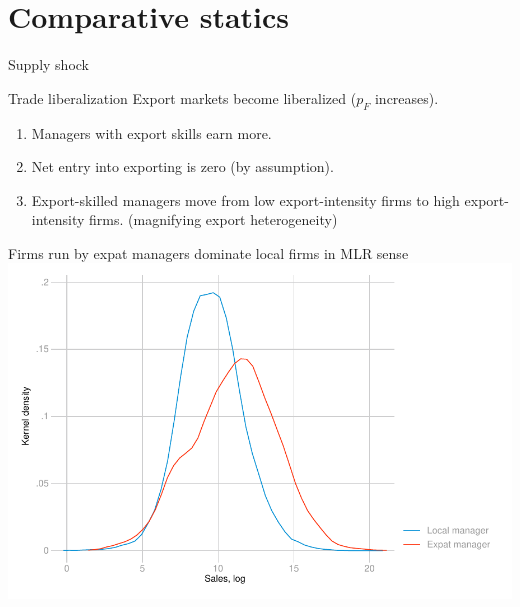 \documentclass[
  ignorenonframetext,
  aspectratio=43,
]{beamer}
\providecommand{\tightlist}{%
  \setlength{\itemsep}{0pt}\setlength{\parskip}{0pt}}
\begin{document}
\hypertarget{comparative-statics}{%
\section{Comparative statics}\label{comparative-statics}}

\begin{frame}{Supply shock}
\protect\hypertarget{supply-shock}{}
\end{frame}

\begin{frame}{Trade liberalization}
\protect\hypertarget{trade-liberalization}{}
Export markets become liberalized (\(p_F\) increases).

\begin{enumerate}
\tightlist
\item
  Managers with export skills earn more.
\item
  Net entry into exporting is zero (by assumption).
\item
  Export-skilled managers move from low export-intensity firms to high
  export-intensity firms. (magnifying export heterogeneity)
\end{enumerate}
\end{frame}

\begin{frame}{Firms run by expat managers dominate local firms in MLR
sense}
\protect\hypertarget{firms-run-by-expat-managers-dominate-local-firms-in-mlr-sense}{}
\includegraphics[width=\textwidth,height=0.7\textheight]{figure/FSD.pdf}
\end{frame}
\end{document}
